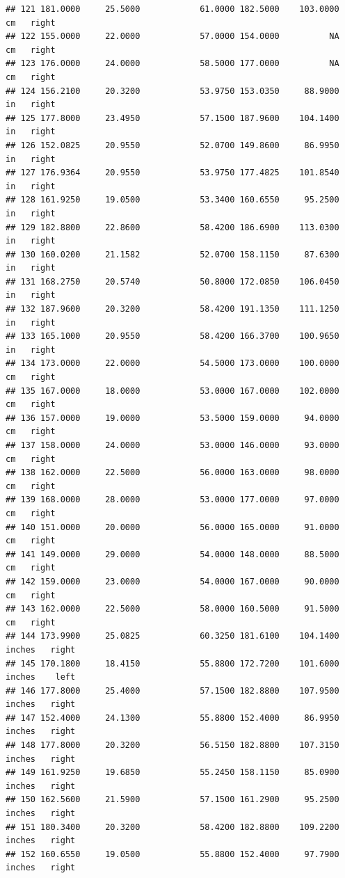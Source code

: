 \documentclass[]{article}
\begin{document}
\begin{verbatim}
## 121 181.0000     25.5000            61.0000 182.5000    103.0000     cm   right
## 122 155.0000     22.0000            57.0000 154.0000          NA     cm   right
## 123 176.0000     24.0000            58.5000 177.0000          NA     cm   right
## 124 156.2100     20.3200            53.9750 153.0350     88.9000     in   right
## 125 177.8000     23.4950            57.1500 187.9600    104.1400     in   right
## 126 152.0825     20.9550            52.0700 149.8600     86.9950     in   right
## 127 176.9364     20.9550            53.9750 177.4825    101.8540     in   right
## 128 161.9250     19.0500            53.3400 160.6550     95.2500     in   right
## 129 182.8800     22.8600            58.4200 186.6900    113.0300     in   right
## 130 160.0200     21.1582            52.0700 158.1150     87.6300     in   right
## 131 168.2750     20.5740            50.8000 172.0850    106.0450     in   right
## 132 187.9600     20.3200            58.4200 191.1350    111.1250     in   right
## 133 165.1000     20.9550            58.4200 166.3700    100.9650     in   right
## 134 173.0000     22.0000            54.5000 173.0000    100.0000     cm   right
## 135 167.0000     18.0000            53.0000 167.0000    102.0000     cm   right
## 136 157.0000     19.0000            53.5000 159.0000     94.0000     cm   right
## 137 158.0000     24.0000            53.0000 146.0000     93.0000     cm   right
## 138 162.0000     22.5000            56.0000 163.0000     98.0000     cm   right
## 139 168.0000     28.0000            53.0000 177.0000     97.0000     cm   right
## 140 151.0000     20.0000            56.0000 165.0000     91.0000     cm   right
## 141 149.0000     29.0000            54.0000 148.0000     88.5000     cm   right
## 142 159.0000     23.0000            54.0000 167.0000     90.0000     cm   right
## 143 162.0000     22.5000            58.0000 160.5000     91.5000     cm   right
## 144 173.9900     25.0825            60.3250 181.6100    104.1400 inches   right
## 145 170.1800     18.4150            55.8800 172.7200    101.6000 inches    left
## 146 177.8000     25.4000            57.1500 182.8800    107.9500 inches   right
## 147 152.4000     24.1300            55.8800 152.4000     86.9950 inches   right
## 148 177.8000     20.3200            56.5150 182.8800    107.3150 inches   right
## 149 161.9250     19.6850            55.2450 158.1150     85.0900 inches   right
## 150 162.5600     21.5900            57.1500 161.2900     95.2500 inches   right
## 151 180.3400     20.3200            58.4200 182.8800    109.2200 inches   right
## 152 160.6550     19.0500            55.8800 152.4000     97.7900 inches   right

\end{verbatim}
\end{document}
